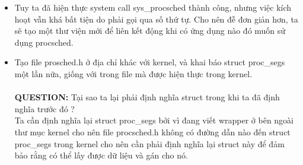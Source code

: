 \documentclass[a4paper]{article}
\begin{document}
\begin{itemize}
\item Tuy ta đã hiện thực system call sys\_procsched thành công, nhưng việc kích hoạt vẫn khá bất tiện do phải gọi qua số thứ tự. Cho nên đễ đơn giản hơn, ta sẽ tạo một thư viện mới để liên kết động khi có ứng dụng nào đó muốn sử dụng procsched.
\item Tạo file prosched.h ở địa chỉ khác với kernel, và khai báo {\color{blue}struct} proc\_segs một lần nữa, giống với trong file mà được
hiện thực trong kernel.
\\
\\
\textbf{QUESTION:} Tại sao ta lại phải định nghĩa struct trong khi ta đã định nghĩa trước đó ?\\
Ta cần định nghĩa lại struct proc\_segs bởi vì đang viết wrapper ở bên ngoài
thư mục kernel cho nên file procsched.h không có đường dẫn nào đến
struct proc\_segs trong kernel cho nên cần phải định nghĩa lại struct này
để đảm bảo rằng có thể lấy được dữ liệu và gán cho nó.


\end{itemize}
\end{document}
